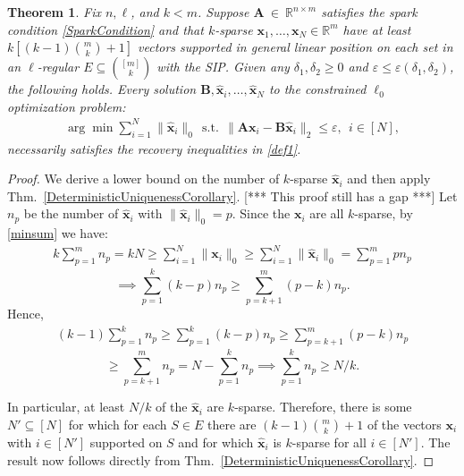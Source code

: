 \documentclass[9pt,twocolumn]{pnas-new}
\newtheorem{theorem}{Theorem}
\begin{document}
\begin{theorem}
Fix $n, \ell$, and $k < m$. Suppose $\mathbf{A}~\in~\mathbb{R}^{n \times m}$ satisfies the spark condition \eqref{SparkCondition} and that $k$-sparse \mbox{$\mathbf{x}_1, \ldots, \mathbf{x}_N \in \mathbb{R}^m$} have at least \mbox{$k \left[ (k-1){ m \choose k} + 1 \right]$} vectors supported in general linear position on each set in an $\ell$-regular $E \subseteq {[m] \choose k}$ with the SIP.  Given any $\delta_1, \delta_2 \geq 0$ and $\varepsilon \leq \varepsilon(\delta_1, \delta_2)$, the following holds.  %
Every solution $\mathbf{B}, \mathbf{\hat x}_i, \ldots, \mathbf{\hat x}_N$ to the constrained $\ell_0$ optimization problem:
\begin{align}\label{minsum}
\arg \min \sum_{i = 1}^N \|\mathbf{\hat x}_i\|_0 \ \ \text{s.t.} \ \ \|\mathbf{A}\mathbf{x}_i - \mathbf{B}\mathbf{\hat x}_i\|_2 \leq \varepsilon, \ \ \text{$i \in [N]$},
\end{align}
necessarily satisfies the recovery inequalities in \eqref{def1}. %
\end{theorem}

\begin{proof}
We derive a lower bound on the number of $k$-sparse  $\mathbf{\hat x}_i$ and then apply Thm.~\ref{DeterministicUniquenessCorollary}. 
[*** This proof still has a gap ***]
Let $n_p$ be the number of $\mathbf{\hat x}_i$ with $\|\mathbf{\hat x}_i\|_0 = p$.  %
Since the $\mathbf{x}_i$ are all $k$-sparse, by \eqref{minsum} we have:
\begin{align}
k \sum_{p = 1}^{m} n_p = kN \geq \sum_{i=1}^N \|\mathbf{x}_i\|_0 \geq \sum_{i=1}^N \|\mathbf{\hat x}_i\|_0 = \sum_{p=1}^{m} p n_p 
\end{align}
\[\implies \sum_{p = 1}^k (k-p)n_p \geq \sum_{p = k+1}^{m} (p-k) n_p.\]
Hence,
\begin{align}
(k-1) \sum_{p =1}^k n_p \geq \sum_{p = 1}^k (k-p)n_p \geq \sum_{p = k+1}^{m} (p-k) n_p
\end{align}
\[ \geq \sum_{p = k+1}^{m} n_p = N - \sum_{p = 1}^k n_p \implies \sum_{p =1}^k n_p \geq N / k.\]

In particular, at least $N / k$ of the $\mathbf{\hat x}_i$ are $k$-sparse. Therefore, there is some $N' \subseteq [N]$ for which for each $S \in E$ there are $(k-1){m \choose k}+1$ of the vectors $\mathbf{x}_i$ with $i \in [N']$ supported on $S$ and for which $\mathbf{\hat x}_i$ is $k$-sparse for all $i \in [N']$.  The result now follows directly from Thm.~\ref{DeterministicUniquenessCorollary}. %
\end{proof}
\end{document}
